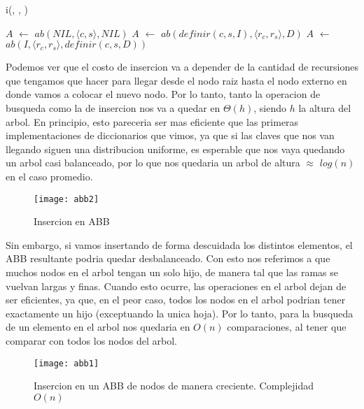 \documentclass[10pt,a4paper]{article}
\begin{document}
\begin{algorithm}[H]{i(, , )}
	\begin{algorithmic}[1]
		\State $A$ $\gets$ $ab(NIL, \langle c,s \rangle, NIL)$                      
		\Else
		\State $A$ $\gets$ $ab(definir(c,s,I), \langle r_{c},r_{s} \rangle, D)$
		\Else                    
		\State $A$ $\gets$ $ab(I, \langle r_{c},r_{s} \rangle, definir(c,s,D))$                     
		\EndIf
		\EndIf
		
		\medskip
	\end{algorithmic}
\end{algorithm}

Podemos ver que el costo de insercion va a depender de la cantidad de recursiones que tengamos que hacer para llegar desde el nodo raiz hasta el nodo externo en donde vamos a colocar el nuevo nodo. Por lo tanto, tanto la operacion de busqueda como la de insercion nos va a quedar en $\Theta(h)$, siendo $h$ la altura del arbol. En principio, esto pareceria ser mas eficiente que las primeras implementaciones de diccionarios que vimos, ya que si las claves que nos van llegando siguen una distribucion uniforme, es esperable que nos vaya quedando un arbol casi balanceado, por lo que nos quedaria un arbol de altura $\approx$ $log(n)$ en el caso promedio.

\begin{figure}[h]
	\centering
	\texttt{[image: abb2]}
	\caption{Insercion en ABB}
	\label{drivers1}
\end{figure}



Sin embargo, si vamos insertando de forma descuidada los distintos elementos, el ABB resultante podria quedar desbalanceado. Con esto nos referimos a que muchos nodos en el arbol tengan un solo hijo, de manera tal que las ramas se vuelvan largas y finas. Cuando esto ocurre, las operaciones en el arbol dejan de ser eficientes, ya que, en el peor caso, todos los nodos en el arbol podrian tener exactamente un hijo (exceptuando la unica hoja). Por lo tanto, para la busqueda de un elemento en el arbol nos quedaria en $O(n)$ comparaciones, al tener que comparar con todos los nodos del arbol.

\begin{figure}[h]
	\centering
	\texttt{[image: abb1]}
	\caption{Insercion en un ABB de nodos de manera creciente. Complejidad $O(n)$}
	\label{drivers1}
\end{figure}
\end{document}
